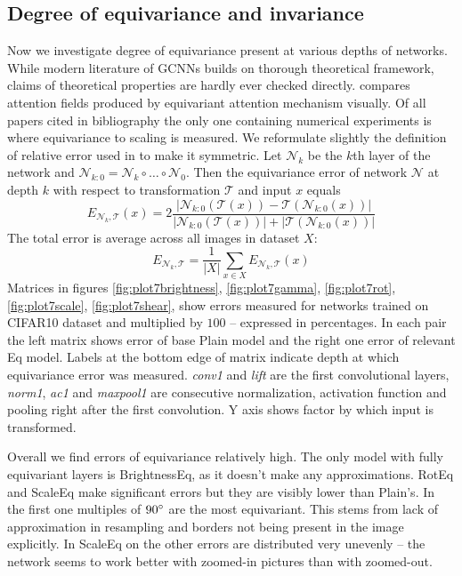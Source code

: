 \subsection{Degree of equivariance and invariance}
    \newcommand{\mcn}{\mathcal{N}}
    \newcommand{\mct}{\mathcal{T}}
    Now we investigate degree of equivariance present at
    various depths of networks. While modern literature of GCNNs builds on
    thorough theoretical framework, claims of theoretical properties are hardly
    ever checked directly. \cite{attentive_gcnn} compares attention fields
    produced by equivariant attention mechanism visually.
    Of all papers cited in bibliography the only one containing numerical
    experiments is
    \cite{scale_steerable} where equivariance to scaling is measured.
    We reformulate slightly the definition of relative error used in
    \cite{scale_steerable} to make it symmetric.
    Let $\mcn_k$ be the $k$th layer of
    the network and $\mcn_{k:0} = \mcn_k \circ \dots \circ \mcn_0$. Then the
    equivariance error of network $\mcn$
    at depth $k$ with respect to transformation $\mathcal{T}$
    and input $x$ equals
    $$ E_{\mcn_k,\mct}(x) = 2\frac{\left|\mcn_{k:0}\left(\mct(x)\right) -
    \mct(\mcn_{k:0}(x))\right|}
    {\left|\mcn_{k:0}(\mct(x))\right| + \left|\mct(\mcn_{k:0}(x))\right|} $$
    The total error is average across all images in dataset $X$:
    $$ E_{\mcn_k,\mct} = \frac{1}{|X|}\sum_{x \in X }E_{\mcn_k,\mct}(x) $$
    Matrices in figures
    \ref{fig:plot7brightness},
    \ref{fig:plot7gamma},
    \ref{fig:plot7rot},
    \ref{fig:plot7scale},
    \ref{fig:plot7shear},
    show errors measured for networks trained on CIFAR10 dataset and multiplied
    by $100$ -- expressed in percentages.
    In each pair the left matrix shows error of base Plain model and the right one
    error of relevant Eq model. Labels at the bottom edge of
    matrix indicate depth at which equivariance error was measured.
    \textit{conv1} and \textit{lift} are the first convolutional layers,
    \textit{norm1}, \textit{ac1} and \textit{maxpool1} are consecutive
    normalization, activation function and pooling right after the first
    convolution. Y axis shows factor by which input is transformed.

    Overall we find errors of equivariance relatively high. The only
    model with
    fully equivariant layers is BrightnessEq, as it doesn't make any
    approximations. RotEq and ScaleEq make significant errors but they are
    visibly lower than Plain's. In the first one multiples of $90 \degree$ are
    the most equivariant. This stems from lack of approximation in resampling
    and borders not being present in the image explicitly. In ScaleEq
    on the other errors are distributed very unevenly -- the network seems to
    work better with zoomed-in pictures than with zoomed-out.

